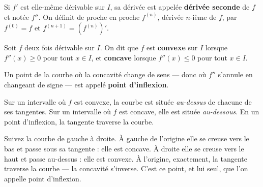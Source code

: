 \begin{definition}
Si $f'$ est elle-même dérivable sur $I$, sa dérivée est appelée
\textbf{dérivée seconde} de $f$ et notée $f''$. On définit de proche en proche
$f^{(n)}$, dérivée $n$-ième de $f$, par $f^{(0)} = f$ et
$f^{(n+1)} = \left(f^{(n)}\right)'$.
\end{definition}

\begin{definition}
Soit $f$ deux fois dérivable sur $I$. On dit que $f$ est \textbf{convexe} sur
$I$ lorsque $f''(x) \geq 0$ pour tout $x \in I$, et \textbf{concave} lorsque
$f''(x) \leq 0$ pour tout $x \in I$.

Un point de la courbe où la concavité change de sens — donc où $f''$ s'annule
en changeant de signe — est appelé \textbf{point d'inflexion}.
\end{definition}

\begin{propriete}
Sur un intervalle où $f$ est convexe, la courbe est située \emph{au-dessus} de
chacune de ses tangentes. Sur un intervalle où $f$ est concave, elle est
située \emph{au-dessous}. En un point d'inflexion, la tangente traverse la
courbe.
\end{propriete}

\begin{visualisation}
\begin{center}
\end{center}

Suivez la courbe de gauche à droite. À gauche de l'origine elle se creuse vers
le bas et passe sous sa tangente : elle est concave. À droite elle se creuse
vers le haut et passe au-dessus : elle est convexe. À l'origine, exactement,
la tangente traverse la courbe — la concavité s'inverse. C'est ce point, et
lui seul, que l'on appelle point d'inflexion.
\end{visualisation}

